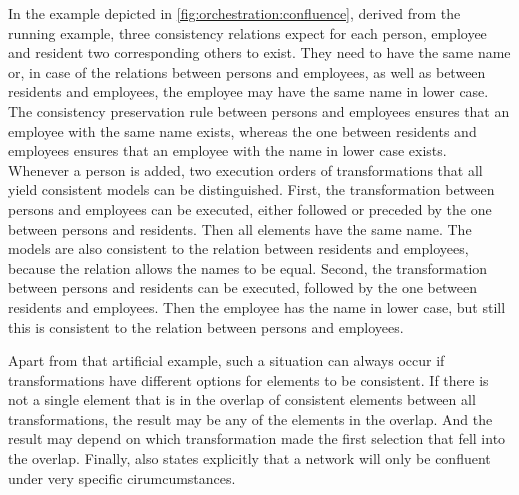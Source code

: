 In the example depicted in \autoref{fig:orchestration:confluence}, derived from the running example, three consistency relations expect for each person, employee and resident two corresponding others to exist.
They need to have the same name or, in case of the relations between persons and employees, as well as between residents and employees, the employee may have the same name in lower case.
The consistency preservation rule between persons and employees ensures that an employee with the same name exists, whereas the one between residents and employees ensures that an employee with the name in lower case exists.
Whenever a person is added, two execution orders of transformations that all yield consistent models can be distinguished.
First, the transformation between persons and employees can be executed, either followed or preceded by the one between persons and residents. Then all elements have the same name.
The models are also consistent to the relation between residents and employees, because the relation allows the names to be equal.
Second, the transformation between persons and residents can be executed, followed by the one between residents and employees.
Then the employee has the name in lower case, but still this is consistent to the relation between persons and employees.

Apart from that artificial example, such a situation can always occur if transformations have different options for elements to be consistent.
If there is not a single element that is in the overlap of consistent elements between all transformations, the result may be any of the elements in the overlap.
And the result may depend on which transformation made the first selection that fell into the overlap.
Finally, \textcite[p. 14]{stevens2020BidirectionalTransformationLarge-SoSym} also states explicitly that a network will only be confluent under very specific cirumcumstances.




